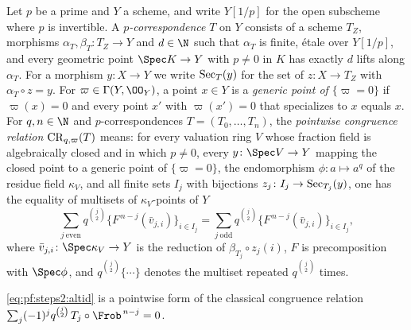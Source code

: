 \begin{definition}\label{def:pf:steps2:ptid}
Let $p$ be a prime and $Y$ a scheme, and write $Y[1/p]$ for the open subscheme where $p$ is
invertible. A \emph{$p$-correspondence} $T$ on $Y$ consists of a scheme $T_Z$, morphisms
$\alpha_T,\beta_T\colon T_Z\to Y$ and $d\in\N$ such that $\alpha_T$ is finite, \'etale over $Y[1/p]$,
and every geometric point $\Spec K\to Y$ with $p\ne0$ in $K$ has exactly $d$ lifts along $\alpha_T$.
For a morphism $y\colon X\to Y$ we write $\mathrm{Sec}_T(y)$ for the set of $z\colon X\to T_Z$ with
$\alpha_T\circ z=y$. For $\varpi\in\Gamma(Y,\OO_Y)$, a point $x\in Y$ is a \emph{generic point of
$\{\varpi=0\}$} if $\varpi(x)=0$ and every point $x'$ with $\varpi(x')=0$ that specializes to $x$
equals $x$. For $q,n\in\N$ and $p$-correspondences $T=(T_0,\dots,T_n)$, the \emph{pointwise
congruence relation} $\mathrm{CR}_{q,\varpi}(T)$ means: for every valuation ring $V$ whose fraction
field is algebraically closed and in which $p\ne0$, every $y\colon\Spec V\to Y$ mapping the closed
point to a generic point of $\{\varpi=0\}$, the endomorphism $\phi\colon a\mapsto a^q$ of the
residue field $\kappa_V$, and all finite sets $I_j$ with bijections
$z_j\colon I_j\to\mathrm{Sec}_{T_j}(y)$, one has the equality of multisets of $\kappa_V$-points of $Y$
\begin{equation}\label{eq:pf:steps2:altid}
  \sum_{j\ \mathrm{even}}q^{\binom j2}\bigl\{F^{\,n-j}(\bar v_{j,i})\bigr\}_{i\in I_j}
  =\sum_{j\ \mathrm{odd}}q^{\binom j2}\bigl\{F^{\,n-j}(\bar v_{j,i})\bigr\}_{i\in I_j},
\end{equation}
where $\bar v_{j,i}\colon\Spec\kappa_V\to Y$ is the reduction of $\beta_{T_j}\circ z_j(i)$, $F$ is
precomposition with $\Spec\phi$, and $q^{\binom j2}\{\cdots\}$ denotes the multiset repeated
$q^{\binom j2}$ times.
\end{definition}

\eqref{eq:pf:steps2:altid} is a pointwise form of the classical congruence relation
$\sum_j(-1)^jq^{\binom j2}\,T_j\circ\Frob^{\,n-j}=0$.

